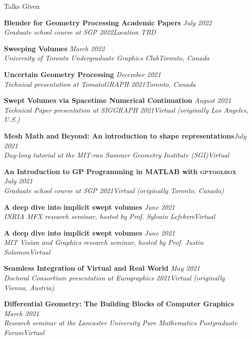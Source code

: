 \documentclass{resume} %
\begin{document}
\begin{rSection}{Talks Given}

{\bf Blender for Geometry Processing Academic Papers} \hfill {\em July 2022}\\ 
{\it Graduate school course at SGP 2022}\hfill {\em Location TBD}


{\bf Sweeping Volumes} \hfill {\em March 2022}\\ 
{\it University of Toronto Undergraduate Graphics Club}\hfill {\em Toronto, Canada}

{\bf Uncertain Geometry Processing} \hfill {\em December 2021}\\ 
{\it Technical presentation at TomatoGRAPH 2021}\hfill {\em Toronto, Canada}

{\bf Swept Volumes via Spacetime Numerical Continuation} \hfill {\em August 2021}\\ 
{\it Technical Paper presentation at SIGGRAPH 2021}\hfill {\em Virtual (originally Los Angeles, U.S.)}

{\bf Mesh Math and Beyond: An introduction to shape representations}\hfill {\em July 2021}\\ 
{\it Day-long tutorial at the MIT-ran Summer Geometry Institute (SGI)}\hfill {\em Virtual}

{\bf An Introduction to GP Programming in MATLAB with \textsc{gptoolbox}} \hfill {\em July 2021}\\ 
{\it Graduate school course at SGP 2021}\hfill {\em Virtual (originally Toronto, Canada)}

{\bf A deep dive into implicit swept volumes} \hfill {\em June 2021}\\ 
{\it INRIA MFX research seminar, hosted by Prof. Sylvain Lefebvre}\hfill {\em Virtual}

{\bf A deep dive into implicit swept volumes} \hfill {\em June 2021}\\ 
{\it MIT Vision and Graphics research seminar, hosted by Prof. Justin Solomon}\hfill {\em Virtual}

{\bf Seamless Integration of Virtual and Real World} \hfill {\em May 2021}\\ 
{\it Doctoral Consortium presentation at Eurographics 2021}\hfill {\em Virtual (originally Vienna, Austria)}

{\bf Differential Geometry: The Building Blocks of Computer Graphics} \hfill {\em March 2021}\\ 
{\it Research seminar at the Lancaster University Pure Mathematics Postgraduate Forum}\hfill {\em Virtual}


\end{rSection}
\end{document}
